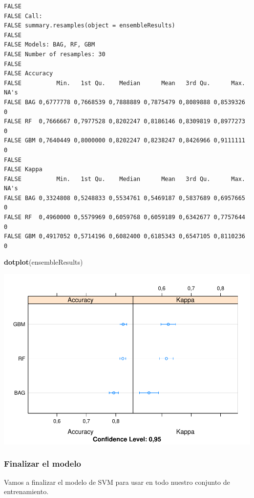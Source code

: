 \documentclass[]{article}
\newenvironment{Shaded}{\begin{snugshade}}{\end{snugshade}}
\newcommand{\KeywordTok}[1]{\textcolor[rgb]{0.13,0.29,0.53}{\textbf{#1}}}
\newcommand{\NormalTok}[1]{#1}
\begin{document}
\begin{verbatim}
FALSE 
FALSE Call:
FALSE summary.resamples(object = ensembleResults)
FALSE 
FALSE Models: BAG, RF, GBM 
FALSE Number of resamples: 30 
FALSE 
FALSE Accuracy 
FALSE          Min.   1st Qu.    Median      Mean   3rd Qu.      Max. NA's
FALSE BAG 0,6777778 0,7668539 0,7888889 0,7875479 0,8089888 0,8539326    0
FALSE RF  0,7666667 0,7977528 0,8202247 0,8186146 0,8309819 0,8977273    0
FALSE GBM 0,7640449 0,8000000 0,8202247 0,8238247 0,8426966 0,9111111    0
FALSE 
FALSE Kappa 
FALSE          Min.   1st Qu.    Median      Mean   3rd Qu.      Max. NA's
FALSE BAG 0,3324808 0,5248833 0,5534761 0,5469187 0,5837689 0,6957665    0
FALSE RF  0,4960000 0,5579969 0,6059768 0,6059189 0,6342677 0,7757644    0
FALSE GBM 0,4917052 0,5714196 0,6082400 0,6185343 0,6547105 0,8110236    0
\end{verbatim}

\begin{Shaded}
\begin{Highlighting}[]
\KeywordTok{dotplot}\NormalTok{(ensembleResults)}
\end{Highlighting}
\end{Shaded}

\includegraphics{titanicDataClean_files/figure-latex/datasetTrain_ensembles_plot-1.pdf}

\subsubsection{Finalizar el modelo}\label{finalizar-el-modelo}

Vamos a finalizar el modelo de SVM para usar en todo nuestro conjunto de
entrenamiento.
\end{document}
